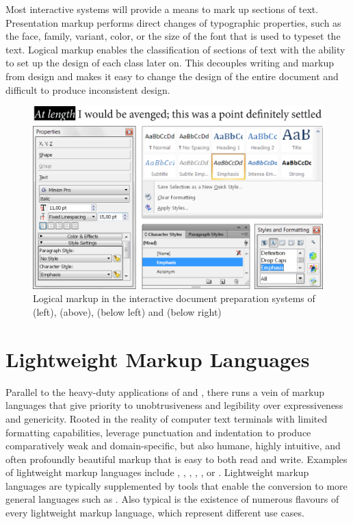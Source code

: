 \documentclass{book}
\begin{document}
Most interactive systems will provide a means to mark up sections of text.
Presentation markup performs direct changes of typographic properties, such as
the face, family, variant, color, or the size of the font that is used to
typeset the text. Logical markup enables the classification of sections of text
with the ability to set up the design of each class later on. This decouples
writing and markup from design and makes it easy to change the design of the
entire document and difficult to produce inconsistent design.

\begin{figure}
  \includegraphics[width=\textwidth]{examples/02/interactive-editors.png}
  \caption{Logical markup in the interactive document preparation systems of
     (left),  (above), 
    (below left) and  (below right)}
\end{figure}

\section{Lightweight Markup Languages}
Parallel to the heavy-duty applications of  and ,
there runs a vein of markup languages that give priority to unobtrusiveness and
legibility over expressiveness and genericity. Rooted in the reality of
computer text terminals with limited formatting capabilities,   leverage punctuation and
indentation to produce comparatively weak and domain-specific, but also humane,
highly intuitive, and often profoundly beautiful markup that is easy to both
read and write. Examples of lightweight markup languages include ,
, , , , or .
Lightweight markup languages are typically supplemented by tools that enable
the conversion to more general languages such as . Also typical
is the existence of numerous flavours of every lightweight markup language,
which represent different use cases.
\end{document}
